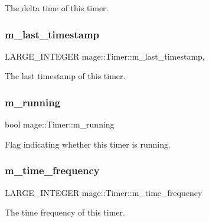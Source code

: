 The delta time of this timer. \hypertarget{classmage_1_1_timer_a6effbc37827492397cc781a78165a08a}{}\label{classmage_1_1_timer_a6effbc37827492397cc781a78165a08a} 
\subsubsection{\texorpdfstring{m\+\_\+last\+\_\+timestamp}{m\_last\_timestamp}}
{\footnotesize\ttfamily L\+A\+R\+G\+E\+\_\+\+I\+N\+T\+E\+G\+ER mage\+::\+Timer\+::m\+\_\+last\+\_\+timestamp\hspace{0.3cm}{\ttfamily [mutable]}, {\ttfamily [private]}}

The last timestamp of this timer. \hypertarget{classmage_1_1_timer_ac8d975843e5b2199848284de910d3291}{}\label{classmage_1_1_timer_ac8d975843e5b2199848284de910d3291} 
\subsubsection{\texorpdfstring{m\+\_\+running}{m\_running}}
{\footnotesize\ttfamily bool mage\+::\+Timer\+::m\+\_\+running\hspace{0.3cm}{\ttfamily [private]}}

Flag indicating whether this timer is running. \hypertarget{classmage_1_1_timer_a64e9afd31a95058e1736e84122c663d3}{}\label{classmage_1_1_timer_a64e9afd31a95058e1736e84122c663d3} 
\subsubsection{\texorpdfstring{m\+\_\+time\+\_\+frequency}{m\_time\_frequency}}
{\footnotesize\ttfamily L\+A\+R\+G\+E\+\_\+\+I\+N\+T\+E\+G\+ER mage\+::\+Timer\+::m\+\_\+time\+\_\+frequency\hspace{0.3cm}{\ttfamily [private]}}

The time frequency of this timer. \hypertarget{classmage_1_1_timer_a666e06f94a9c5875ab6cbce8d2750a11}{}\label{classmage_1_1_timer_a666e06f94a9c5875ab6cbce8d2750a11} 
